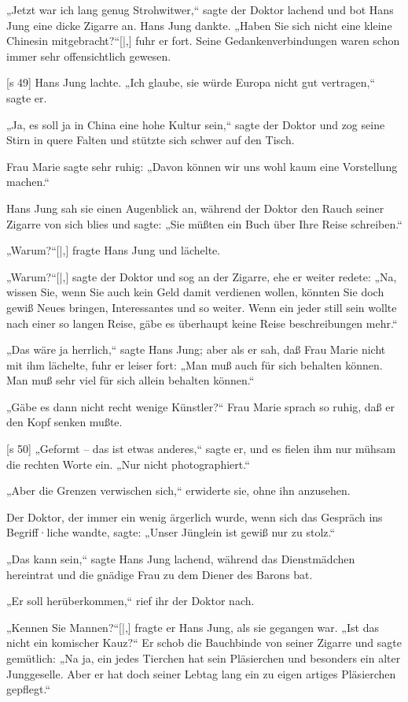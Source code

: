 „Jetzt war ich lang genug Strohwitwer,“ sagte
der Doktor lachend und bot Hans Jung eine dicke
Zigarre an. Hans Jung dankte. „Haben Sie sich
nicht eine kleine Chinesin mitgebracht?“[|,] fuhr er fort.
Seine Gedankenverbindungen waren schon immer
sehr offensichtlich gewesen.

[s 49]
Hans Jung lachte. „Ich glaube, sie würde Europa
nicht gut vertragen,“ sagte er.

„Ja, es soll ja in China eine hohe Kultur sein,“
sagte der Doktor und zog seine Stirn in quere Falten
und stützte sich schwer auf den Tisch.

Frau Marie sagte sehr ruhig: „Davon können
wir uns wohl kaum eine Vorstellung machen.“

Hans Jung sah sie einen Augenblick an, während
der Doktor den Rauch seiner Zigarre von sich blies
und sagte: „Sie müßten ein Buch über Ihre Reise
schreiben.“

„Warum?“[|,] fragte Hans Jung und lächelte.

„Warum?“[|,] sagte der Doktor und sog an der
Zigarre, ehe er weiter redete: „Na, wissen Sie, wenn
Sie auch kein Geld damit verdienen wollen, könnten
Sie doch gewiß Neues bringen, Interessantes und
so weiter. Wenn ein jeder still sein wollte nach
einer so langen Reise, gäbe es überhaupt keine Reise­
beschreibungen mehr.“

„Das wäre ja herrlich,“ sagte Hans Jung; aber
als er sah, daß Frau Marie nicht mit ihm lächelte,
fuhr er leiser fort: „Man muß auch für sich behalten
können. Man muß sehr viel für sich allein behalten
können.“

„Gäbe es dann nicht recht wenige Künstler?“ Frau
Marie sprach so ruhig, daß er den Kopf senken mußte.

[s 50]
„Geformt – das ist etwas anderes,“ sagte er,
und es fielen ihm nur mühsam die rechten Worte
ein. „Nur nicht photographiert.“

„Aber die Grenzen verwischen sich,“ erwiderte
sie, ohne ihn anzusehen.

Der Doktor, der immer ein wenig ärgerlich wurde,
wenn sich das Gespräch ins Begriff·liche wandte, sagte:
„Unser Jünglein ist gewiß nur zu stolz.“

„Das kann sein,“ sagte Hans Jung lachend,
während das Dienstmädchen hereintrat und die gnädige
Frau zu dem Diener des Barons bat.

„Er soll herüberkommen,“ rief ihr der Doktor
nach.

„Kennen Sie Mannen?“[|,] fragte er Hans Jung,
als sie gegangen war. „Ist das nicht ein komischer
Kauz?“ Er schob die Bauchbinde von seiner Zigarre
und sagte gemütlich: „Na ja, ein jedes Tierchen hat
sein Pläsierchen und besonders ein alter Junggeselle.
Aber er hat doch seiner Lebtag lang ein zu eigen­
artiges Pläsierchen gepflegt.“

